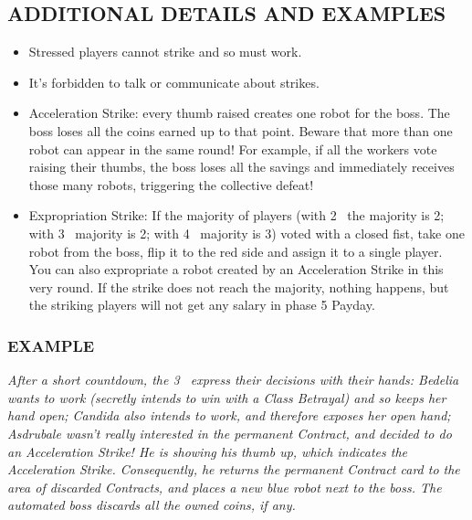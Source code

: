    
    \subsection{ADDITIONAL DETAILS AND EXAMPLES}

        \begin{itemize}
            \item Stressed players cannot strike and so must work.
            \item It's forbidden to talk or communicate about strikes.
            \item Acceleration Strike: every thumb raised creates one robot for the boss.
            The boss loses all the coins earned up to that point. Beware that more than
            one robot can appear in the same round! For example, if all the workers
            vote raising their thumbs, the boss loses all the savings and immediately
            receives those many robots, triggering the collective defeat!
            \item Expropriation Strike: If the majority of players (with 2 \faPeopleGroup\ the majority is 2;
            with 3 \faPeopleGroup\ majority is 2; with 4 \faPeopleGroup\ majority is 3) voted with a closed fist, take
            one robot from the boss, flip it to the red side and assign it to a single player.
            You can also expropriate a robot created by an Acceleration Strike in this very
            round. If the strike does not reach the majority, nothing happens, but the
            striking players will not get any salary in phase 5 Payday.
        \end{itemize}
    
        \subsubsection{EXAMPLE}

            \textit{After a short countdown, the 3 \faPeopleGroup\ express their decisions with their hands: Bedelia
            wants to work (secretly intends to win with a Class Betrayal) and so keeps her
            hand open; Candida also intends to work, and therefore exposes her open hand;
            Asdrubale wasn't really interested in the permanent Contract, and decided to do
            an Acceleration Strike! He is showing his thumb up, which indicates the Acceleration
            Strike. Consequently, he returns the permanent Contract card to the area of
            discarded Contracts, and places a new blue robot next to the boss. The automated
            boss discards all the owned coins, if any.}



